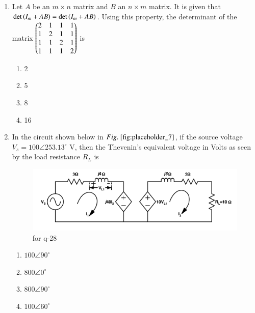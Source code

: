 \documentclass[journal,12pt,onecolumn]{IEEEtran}
\theoremstyle{remark}
\begin{document}
\begin{enumerate}
\begin{multicols}{4}
\begin{enumerate}
\item $\frac{4}{9}$
\item $\frac{1}{2}$
\item $\frac{2}{3}$
\item $\frac{5}{9}$
\end{enumerate}
\end{multicols}
\hfill {}


\item Let $A$ be an $m \times n$ matrix and $B$ an $n \times m$ matrix. It is given that $\det\left(I_m + AB\right) = \det\left(I_m + AB\right)$. Using this property, the determinant of the matrix
$\begin{pmatrix}2 & 1 & 1 & 1 \\
1 & 2 & 1 & 1 \\
1 & 1 & 2 & 1 \\
1 & 1 & 1 & 2\end{pmatrix}$
is
\begin{multicols}{4}
\begin{enumerate}
\item 2
\item 5
\item 8
\item 16
\end{enumerate}
\end{multicols}
\hfill {}

\item In the circuit shown below in $\figref{fig:placeholder_7}$, if the source voltage $V_s = 100\angle 253.13^\circ$ V, then the Thevenin's equivalent voltage in Volts as seen by the load resistance $R_L$ is
\begin{figure}[H]
    \centering
    \includegraphics[width=0.5\columnwidth]{figs/fig_7.png}
    \caption{\centering for q-28}
    \label{fig:placeholder_7}
\end{figure}
\begin{multicols}{4}
\begin{enumerate}
\item $100\angle 90^\circ$
\item $800\angle 0^\circ$
\item $800\angle 90^\circ$
\item $100\angle 60^\circ$
\end{enumerate}
\end{multicols}
\hfill {}


\end{enumerate}
\end{document}
